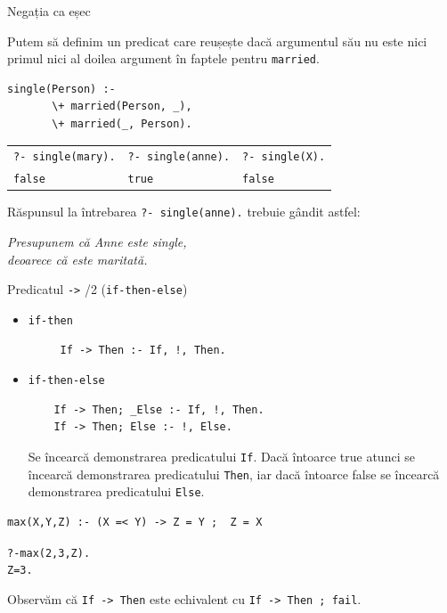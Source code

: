 \documentclass[xcolor=x11names,compress,10pt]{beamer}
\begin{document}
\begin{frame}[fragile]{Negația ca eșec}

\begin{example}[cont.]
Putem să definim un predicat \texttt{} care reușește dacă argumentul său nu este nici primul nici al doilea argument în faptele pentru \texttt{married}.

\begin{verbatim}
single(Person) :-
       \+ married(Person, _),
       \+ married(_, Person).
\end{verbatim}

\begin{tabular}{lll}
\texttt{?- single(mary).} &  \texttt{?- single(anne).}  &  \texttt{?- single(X).} \\
\texttt{false}  & \texttt{true} & \texttt{false}
\end{tabular}

\bigskip
Răspunsul la întrebarea \texttt{?- single(anne).} trebuie gândit astfel:
\begin{center}
{\em Presupunem că Anne este single, \\ deoarece  că este maritată.}
\end{center}
\end{example}
\end{frame}


\begin{frame}[fragile]{Predicatul \texttt{->} /2 (\texttt{if-then-else})}

\begin{itemize}
	\item  \texttt{if-then}
	
	\begin{verbatim}
     If -> Then :- If, !, Then.
	\end{verbatim}
	\pause
	
	\item  \texttt{if-then-else}
	
	\begin{verbatim}
    If -> Then; _Else :- If, !, Then.
    If -> Then; Else :- !, Else.
	\end{verbatim}
	
Se încearcă demonstrarea predicatului \texttt{If}. Dacă întoarce true atunci se încearcă demonstrarea predicatului \texttt{Then}, iar dacă întoarce false se încearcă demonstrarea predicatului \texttt{Else}.	
\end{itemize}

\begin{verbatim}
max(X,Y,Z) :- (X =< Y) -> Z = Y ;  Z = X  
\end{verbatim}

\begin{alltt}
?- max(2,3,Z).
Z = 3.
\end{alltt}

\medskip\pause

Observăm că  \texttt{If -> Then} este  echivalent cu 
\texttt{If -> Then ; fail}.
\end{frame}
\end{document}
